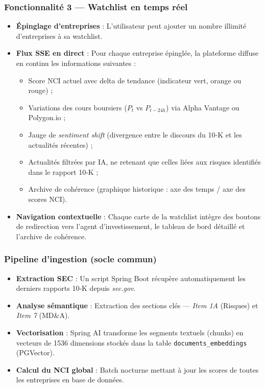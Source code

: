 \subsubsection{Fonctionnalité 3 — Watchlist en temps réel}

\begin{itemize}
    \item \textbf{Épinglage d’entreprises} : L’utilisateur peut ajouter un nombre 
    illimité d’entreprises à sa watchlist.

    \item \textbf{Flux SSE en direct} : Pour chaque entreprise épinglée, la 
    plateforme diffuse en continu les informations suivantes :
    \begin{itemize}
        \item Score NCI actuel avec delta de tendance (indicateur vert, orange ou rouge) ;
        \item Variations des cours boursiers ($P_t$ vs $P_{t-24h}$) via Alpha Vantage 
        ou Polygon.io ;
        \item Jauge de \textit{sentiment shift} (divergence entre le discours du 
        10‑K et les actualités récentes) ;
        \item Actualités filtrées par IA, ne retenant que celles liées aux risques 
        identifiés dans le rapport 10‑K ;
        \item Archive de cohérence (graphique historique : axe des temps / axe des 
        scores NCI).
    \end{itemize}

    \item \textbf{Navigation contextuelle} : Chaque carte de la watchlist intègre des 
    boutons de redirection vers l’agent d’investissement, le tableau de bord détaillé 
    et l’archive de cohérence.
\end{itemize}

\subsubsection{Pipeline d’ingestion (socle commun)}

\begin{itemize}
    \item \textbf{Extraction SEC} : Un script Spring Boot récupère automatiquement 
    les derniers rapports 10‑K depuis \textit{sec.gov}.
    \item \textbf{Analyse sémantique} : Extraction des sections clés — 
    \textit{Item 1A} (Risques) et \textit{Item 7} (MD\&A).
    \item \textbf{Vectorisation} : Spring AI transforme les segments textuels 
    (chunks) en vecteurs de 1536 dimensions stockés dans la table 
    \texttt{documents\_embeddings} (PGVector).
    \item \textbf{Calcul du NCI global} : Batch nocturne mettant à jour les scores 
    de toutes les entreprises en base de données.
\end{itemize}

